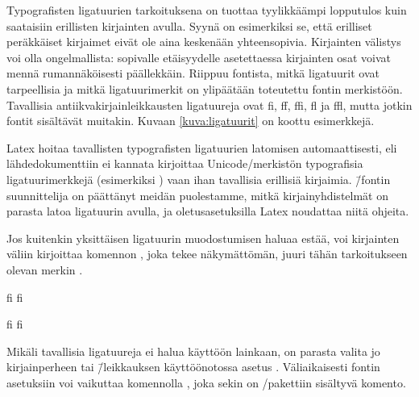 Typografisten ligatuurien tarkoituksena on tuottaa tyylikkäämpi
lopputulos kuin saataisiin erillisten kirjainten avulla. Syynä on
esimerkiksi se, että erilliset peräkkäiset kirjaimet eivät ole aina
keskenään yhteensopivia. Kirjainten välistys voi olla ongelmallista:
sopivalle etäisyydelle asetettaessa kirjainten osat voivat mennä
rumannäköisesti päällekkäin. Riippuu fontista, mitkä ligatuurit ovat
tarpeellisia ja mitkä ligatuurimerkit on ylipäätään toteutettu fontin
merkistöön. Tavallisia an\-tiik\-va\-kir\-jain\-leik\-kaus\-ten
ligatuureja ovat fi, ff, ffi, fl ja ffl, mutta jotkin fontit sisältävät
muitakin. Kuvaan \ref{kuva:ligatuurit} on koottu esimerkkejä.


Latex hoitaa tavallisten typografisten ligatuurien latomisen
automaattisesti, eli lähdedokumenttiin ei kannata kirjoittaa
Unicode\-/merkistön typografisia ligatuurimerkkejä (esimerkiksi
) vaan ihan tavallisia
erillisiä kirjaimia.  \=/fontin suunnittelija on
päättänyt meidän puolestamme, mitkä kir\-jain\-yh\-dis\-tel\-mät on
parasta latoa ligatuurin avulla, ja ole\-tus\-ase\-tuk\-sil\-la Latex
noudattaa niitä ohjeita.

Jos kuitenkin yksittäisen ligatuurin muodostumisen haluaa estää, voi
kirjainten väliin kirjoittaa komennon , joka tekee näkymättömän, juuri tähän
tarkoitukseen olevan merkin .


\begin{koodilohkosis}
  fi f\textcompwordmark i
\end{koodilohkosis}

\begin{tulossis}
  fi f\textcompwordmark i
\end{tulossis}

Mikäli tavallisia ligatuureja ei halua käyttöön lainkaan, on parasta
valita jo kirjainperheen tai \=/leikkauksen käyttöönotossa asetus
. Väliaikaisesti fontin asetuksiin
voi vaikuttaa komennolla , joka sekin
on \-/pakettiin sisältyvä komento.

